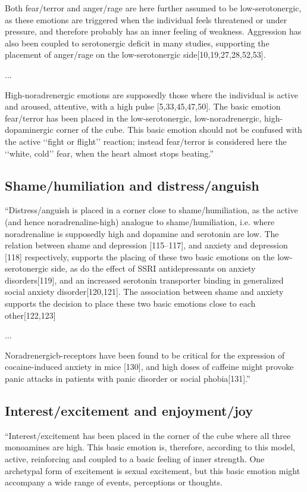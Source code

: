 Both fear/terror and anger/rage are here further assumed to be low-serotonergic, as these emotions are triggered when the individual feels threatened or under pressure, and therefore probably has an inner feeling of weakness. Aggression has also been coupled to serotonergic deficit in many studies, supporting the placement of anger/rage on the low-serotonergic side[10,19,27,28,52,53].

...

High-noradrenergic emotions are supposedly those where the individual is active and aroused, attentive, with a high pulse [5,33,45,47,50]. The basic emotion fear/terror has been placed in the low-serotonergic, low-noradrenergic, high-dopaminergic corner of the cube. This basic emotion should not be confused with the active ‘‘fight or flight’’ reaction; instead fear/terror is considered here the ‘‘white, cold’’ fear, when the heart almost stops beating.''

\subsection{Shame/humiliation and distress/anguish}

``Distress/anguish is placed in a corner close to shame/humiliation, as the active (and hence noradrenaline-high) analogue to shame/humiliation, i.e. where noradrenaline is supposedly high and dopamine and serotonin are low. The relation between shame and depression [115–117], and anxiety and depression [118] respectively, supports the placing of these two basic emotions on the low-serotonergic side, as do the effect of SSRI antidepressants on anxiety disorders[119], and an increased serotonin transporter binding in generalized social anxiety disorder[120,121]. The association between shame and anxiety supports the decision to place these two basic emotions close to each other[122,123]

...

Noradrenergicb-receptors have been found to be critical for the expression of cocaine-induced anxiety in mice [130], and high
doses of caffeine might provoke panic attacks in patients with panic disorder or social phobia[131].''


\subsection{Interest/excitement and enjoyment/joy}

``Interest/excitement has been placed in the corner of the cube where all three monoamines are high. This basic emotion is, therefore, according to this model, active, reinforcing and coupled to a basic feeling of inner strength. One archetypal form of excitement is sexual excitement, but this basic emotion might accompany a wide range of events, perceptions or thoughts.

